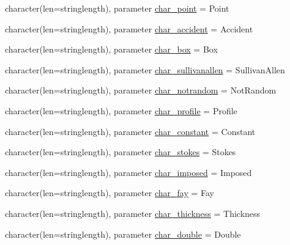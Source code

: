 \begin{DoxyCompactItemize}
\item 
character(len=stringlength), parameter \mbox{\hyperlink{namespacemodulelagrangian_af51e42b2008c9fc0b7f0f8a67426fc1a}{char\+\_\+point}} = \textquotesingle{}Point\textquotesingle{}
\item 
character(len=stringlength), parameter \mbox{\hyperlink{namespacemodulelagrangian_a3d58992501b83300f17849535400cb30}{char\+\_\+accident}} = \textquotesingle{}Accident\textquotesingle{}
\item 
character(len=stringlength), parameter \mbox{\hyperlink{namespacemodulelagrangian_a1bb5489a623f3db3dadc2d102b0673de}{char\+\_\+box}} = \textquotesingle{}Box\textquotesingle{}
\item 
character(len=stringlength), parameter \mbox{\hyperlink{namespacemodulelagrangian_a77257dd5aad536351bc4ef938df9f980}{char\+\_\+sullivanallen}} = \textquotesingle{}Sullivan\+Allen\textquotesingle{}
\item 
character(len=stringlength), parameter \mbox{\hyperlink{namespacemodulelagrangian_a05bc616527a53da22640ad359bf08f95}{char\+\_\+notrandom}} = \textquotesingle{}Not\+Random\textquotesingle{}
\item 
character(len=stringlength), parameter \mbox{\hyperlink{namespacemodulelagrangian_adc8162fbfcd88a0eb8507640bfc80b38}{char\+\_\+profile}} = \textquotesingle{}Profile\textquotesingle{}
\item 
character(len=stringlength), parameter \mbox{\hyperlink{namespacemodulelagrangian_a1adf80ef146c2498b8c3480e13e589ab}{char\+\_\+constant}} = \textquotesingle{}Constant\textquotesingle{}
\item 
character(len=stringlength), parameter \mbox{\hyperlink{namespacemodulelagrangian_a6a2bc2e41e31821fe363572d1751cde9}{char\+\_\+stokes}} = \textquotesingle{}Stokes\textquotesingle{}
\item 
character(len=stringlength), parameter \mbox{\hyperlink{namespacemodulelagrangian_a29a86bbb42bd8a4d0a625014d74b5dde}{char\+\_\+imposed}} = \textquotesingle{}Imposed\textquotesingle{}
\item 
character(len=stringlength), parameter \mbox{\hyperlink{namespacemodulelagrangian_ada928bfd1aeffae2393b775351e8686a}{char\+\_\+fay}} = \textquotesingle{}Fay\textquotesingle{}
\item 
character(len=stringlength), parameter \mbox{\hyperlink{namespacemodulelagrangian_a66367b7cd3bc7bbba76e7d5014c5e8b7}{char\+\_\+thickness}} = \textquotesingle{}Thickness\textquotesingle{}
\item 
character(len=stringlength), parameter \mbox{\hyperlink{namespacemodulelagrangian_a7412b23a2a18daab9938640e25a7831f}{char\+\_\+double}} = \textquotesingle{}Double\textquotesingle{}

\end{DoxyCompactItemize}
